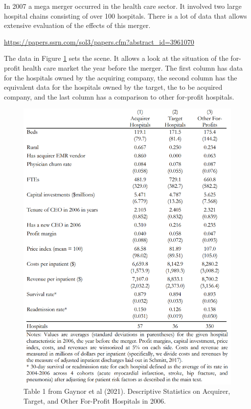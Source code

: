 \documentclass[
]{book}
\begin{document}
In 2007 a mega merger occurred in the health care sector. It involved two large hospital chains consisting of over 100 hospitals. There is a lot of data that allows extensive evaluation of the effects of this merger.

\url{https://papers.ssrn.com/sol3/papers.cfm?abstract_id=3961070}

The data in Figure \ref{fig:oligopolypapertable1} sets the scene. It allows a look at the situation of the for-profit health care market the year before the merger. The first column has data for the hospitals owned by the acquiring company, the second column has the equivalent data for the hospitals owned by the target, the to be acquired company, and the last column has a comparison to other for-profit hospitals.

\begin{figure}

{\centering \includegraphics[width=0.8\linewidth]{img/oligopoly/papertable1} 

}

\caption{Table 1 from Gaynor et al (2021). Descriptive Statistics on Acquirer, Target, and Other For-Profit Hospitals in 2006.}\label{fig:oligopolypapertable1}
\end{figure}
\end{document}
